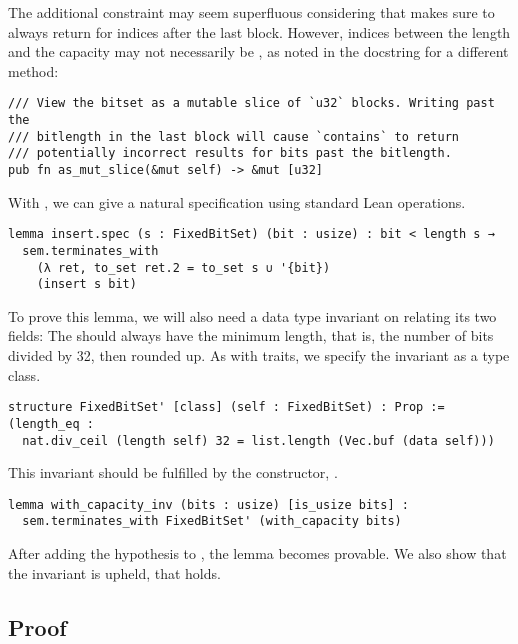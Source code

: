 The additional constraint  may seem superfluous considering
that  makes sure to always return  for indices after
the last  block. However, indices between the length and the capacity
may not necessarily be , as noted in the docstring for a different method:

\begin{verbatim}
/// View the bitset as a mutable slice of `u32` blocks. Writing past the
/// bitlength in the last block will cause `contains` to return
/// potentially incorrect results for bits past the bitlength.
pub fn as_mut_slice(&mut self) -> &mut [u32]
\end{verbatim}

With , we can give  a natural specification using
standard Lean  operations.

\begin{verbatim}
lemma insert.spec (s : FixedBitSet) (bit : usize) : bit < length s →
  sem.terminates_with
    (λ ret, to_set ret.2 = to_set s ∪ '{bit})
    (insert s bit)
\end{verbatim}

To prove this lemma, we will also need a data type invariant on  relating its two
fields: The  should always have the minimum length, that is, the
number of bits divided by 32, then rounded up. As with traits, we specify the
invariant as a type class.

\begin{verbatim}
structure FixedBitSet' [class] (self : FixedBitSet) : Prop :=
(length_eq :
  nat.div_ceil (length self) 32 = list.length (Vec.buf (data self)))
\end{verbatim}

This invariant should be fulfilled by the constructor, .

\begin{verbatim}
lemma with_capacity_inv (bits : usize) [is_usize bits] :
  sem.terminates_with FixedBitSet' (with_capacity bits)
\end{verbatim}

After adding the hypothesis \lean{[FixedBitSet' s]} to , the
lemma becomes provable. We also show that the invariant is upheld, \ie that
 holds.

\subsection{Proof}


